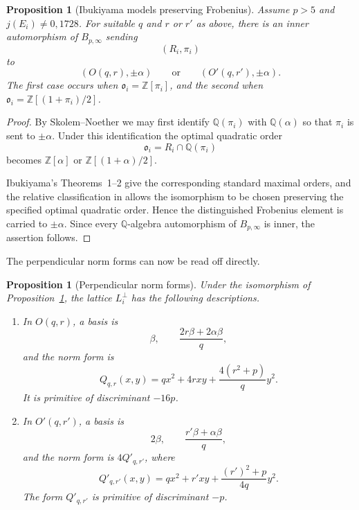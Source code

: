 \documentclass[11pt]{amsart}
\newtheorem{proposition}[theorem]{Proposition}
\theoremstyle{definition}
\theoremstyle{remark}
\newcommand{\Q}{\mathbb{Q}}
\newcommand{\Z}{\mathbb{Z}}
\begin{document}
\begin{proposition}[Ibukiyama models preserving Frobenius]
\label{prop:pair-model}
Assume $p>5$ and $j(E_i)\ne0,1728$. For suitable $q$ and $r$ or $r'$
as above, there is an inner automorphism of $B_{p,\infty}$ sending
\[
  (R_i,\pi_i)
\]
to
\[
  (O(q,r),\pm\alpha)
  \qquad\text{or}\qquad
  (O'(q,r'),\pm\alpha).
\]
The first case occurs when $\mathfrak o_i=\Z[\pi_i]$, and the second
when $\mathfrak o_i=\Z[(1+\pi_i)/2]$.
\end{proposition}

\begin{proof}
By Skolem--Noether we may first identify
$\Q(\pi_i)$ with $\Q(\alpha)$ so that $\pi_i$ is sent to
$\pm\alpha$. Under this identification the optimal quadratic order
\[
  \mathfrak o_i=R_i\cap\Q(\pi_i)
\]
becomes $\Z[\alpha]$ or $\Z[(1+\alpha)/2]$.

Ibukiyama's Theorems~1--2 give the corresponding standard maximal
orders, and the relative classification in
\cite[Section~4, Propositions~4.1--4.2]{Ibukiyama1982}
allows the isomorphism to be chosen preserving the specified optimal
quadratic order. Hence the distinguished Frobenius element is carried to
$\pm\alpha$. Since every $\Q$-algebra automorphism of
$B_{p,\infty}$ is inner, the assertion follows.
\end{proof}


The perpendicular norm forms can now be read off directly.

\begin{proposition}[Perpendicular norm forms]\label{prop:perp-forms}
Under the isomorphism of Proposition~\ref{prop:pair-model}, the lattice $L_i^\perp$ has the following descriptions.
\begin{enumerate}[label=\textup{(\alph*)}]
\item In $O(q,r)$, a basis is
\[
  \beta,\qquad \frac{2r\beta+2\alpha\beta}{q},
\]
and the norm form is
\[
  Q_{q,r}(x,y)=qx^2+4rxy+\frac{4(r^2+p)}q y^2.
\]
It is primitive of discriminant $-16p$.
\item In $O'(q,r')$, a basis is
\[
  2\beta,\qquad\frac{r'\beta+\alpha\beta}{q},
\]
and the norm form is $4Q'_{q,r'}$, where
\[
  Q'_{q,r'}(x,y)=qx^2+r'xy+\frac{(r')^2+p}{4q}y^2.
\]
The form $Q'_{q,r'}$ is primitive of discriminant $-p$.
\end{enumerate}
\end{proposition}
\end{document}
